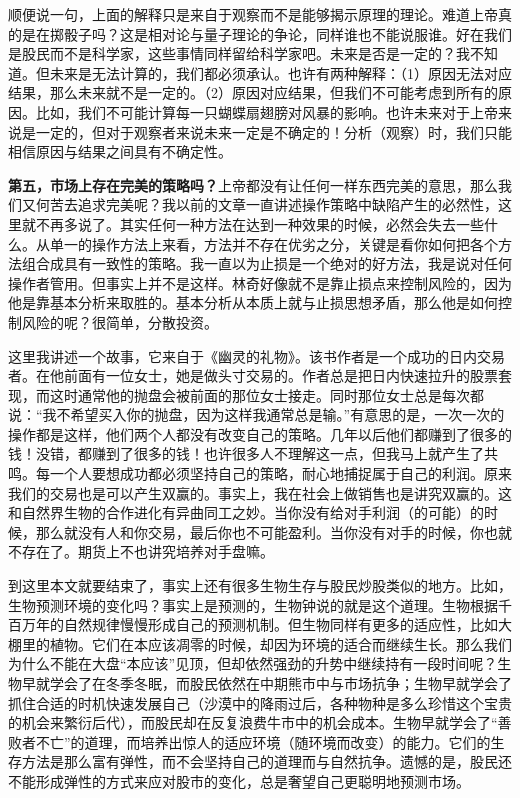 顺便说一句，上面的解释只是来自于观察而不是能够揭示原理的理论。难道上帝真的是在掷骰子吗？这是相对论与量子理论的争论，同样谁也不能说服谁。好在我们是股民而不是科学家，这些事情同样留给科学家吧。未来是否是一定的？我不知道。但未来是无法计算的，我们都必须承认。也许有两种解释：（1）原因无法对应结果，那么未来就不是一定的。（2）原因对应结果，但我们不可能考虑到所有的原因。比如，我们不可能计算每一只蝴蝶扇翅膀对风暴的影响。也许未来对于上帝来说是一定的，但对于观察者来说未来一定是不确定的！分析（观察）时，我们只能相信原因与结果之间具有不确定性。

\textbf{第五，市场上存在完美的策略吗？}上帝都没有让任何一样东西完美的意思，那么我们又何苦去追求完美呢？我以前的文章一直讲述操作策略中缺陷产生的必然性，这里就不再多说了。其实任何一种方法在达到一种效果的时候，必然会失去一些什么。从单一的操作方法上来看，方法并不存在优劣之分，关键是看你如何把各个方法组合成具有一致性的策略。我一直以为止损是一个绝对的好方法，我是说对任何操作者管用。但事实上并不是这样。林奇好像就不是靠止损点来控制风险的，因为他是靠基本分析来取胜的。基本分析从本质上就与止损思想矛盾，那么他是如何控制风险的呢？很简单，分散投资。

这里我讲述一个故事，它来自于《幽灵的礼物》。该书作者是一个成功的日内交易者。在他前面有一位女士，她是做头寸交易的。作者总是把日内快速拉升的股票套现，而这时通常他的抛盘会被前面的那位女士接走。同时那位女士总是每次都说：“我不希望买入你的抛盘，因为这样我通常总是输。”有意思的是，一次一次的操作都是这样，他们两个人都没有改变自己的策略。几年以后他们都赚到了很多的钱！没错，都赚到了很多的钱！也许很多人不理解这一点，但我马上就产生了共鸣。每一个人要想成功都必须坚持自己的策略，耐心地捕捉属于自己的利润。原来我们的交易也是可以产生双赢的。事实上，我在社会上做销售也是讲究双赢的。这和自然界生物的合作进化有异曲同工之妙。当你没有给对手利润（的可能）的时候，那么就没有人和你交易，最后你也不可能盈利。当你没有对手的时候，你也就不存在了。期货上不也讲究培养对手盘嘛。

到这里本文就要结束了，事实上还有很多生物生存与股民炒股类似的地方。比如，生物预测环境的变化吗？事实上是预测的，生物钟说的就是这个道理。生物根据千百万年的自然规律慢慢形成自己的预测机制。但生物同样有更多的适应性，比如大棚里的植物。它们在本应该凋零的时候，却因为环境的适合而继续生长。那么我们为什么不能在大盘“本应该”见顶，但却依然强劲的升势中继续持有一段时间呢？生物早就学会了在冬季冬眠，而股民依然在中期熊市中与市场抗争；生物早就学会了抓住合适的时机快速发展自己（沙漠中的降雨过后，各种物种是多么珍惜这个宝贵的机会来繁衍后代），而股民却在反复浪费牛市中的机会成本。生物早就学会了“善败者不亡”的道理，而培养出惊人的适应环境（随环境而改变）的能力。它们的生存方法是那么富有弹性，而不会坚持自己的道理而与自然抗争。遗憾的是，股民还不能形成弹性的方式来应对股市的变化，总是奢望自己更聪明地预测市场。

